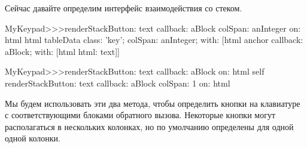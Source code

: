 \documentclass[a4paper,10pt,twoside]{book}
\begin{document}

Сейчас давайте определим интерфейс взаимодействия со стеком.



\begin{code}{}
MyKeypad>>>renderStackButton: text callback: aBlock colSpan: anInteger on: html 
	html tableData
		class: 'key';
		colSpan: anInteger;
		with: 
				[html anchor
					callback: aBlock;
					with: [html html: text]]
\end{code}


\begin{code}{}
MyKeypad>>>renderStackButton: text callback: aBlock on: html 
	self 
		renderStackButton: text
		callback: aBlock
		colSpan: 1
		on: html
\end{code}


Мы будем использовать эти два метода, чтобы определить кнопки на
клавиатуре с соответствующими блоками обратного вызова.
Некоторые кнопки могут располагаться в нескольких колонках, но по
умолчанию определены для одной одной колонки.


\end{document}
